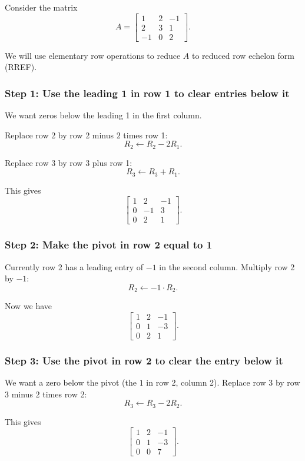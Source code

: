 \documentclass[12pt]{article}
\begin{document}
	Consider the matrix
	\[
	A =
	\begin{bmatrix}
		1 & 2 & -1 \\
		2 & 3 & 1 \\
		-1 & 0 & 2
	\end{bmatrix}.
	\]
	
	We will use elementary row operations to reduce $A$ to reduced row echelon form (RREF).
	
	\subsubsection*{Step 1: Use the leading 1 in row 1 to clear entries below it}
	
	We want zeros below the leading 1 in the first column.
	
	Replace row 2 by row 2 minus $2$ times row 1:
	\[
	R_2 \leftarrow R_2 - 2R_1.
	\]
	
	Replace row 3 by row 3 plus row 1:
	\[
	R_3 \leftarrow R_3 + R_1.
	\]
	
	This gives
	\[
	\begin{bmatrix}
		1 & 2 & -1 \\
		0 & -1 & 3 \\
		0 & 2 & 1
	\end{bmatrix}.
	\]
	
	\subsubsection*{Step 2: Make the pivot in row 2 equal to 1}
	
	Currently row 2 has a leading entry of $-1$ in the second column. Multiply row 2 by $-1$:
	\[
	R_2 \leftarrow -1 \cdot R_2.
	\]
	
	Now we have
	\[
	\begin{bmatrix}
		1 & 2 & -1 \\
		0 & 1 & -3 \\
		0 & 2 & 1
	\end{bmatrix}.
	\]
	
	\subsubsection*{Step 3: Use the pivot in row 2 to clear the entry below it}
	
	We want a zero below the pivot (the $1$ in row 2, column 2). Replace row 3 by row 3 minus $2$ times row 2:
	\[
	R_3 \leftarrow R_3 - 2R_2.
	\]
	
	This gives
	\[
	\begin{bmatrix}
		1 & 2 & -1 \\
		0 & 1 & -3 \\
		0 & 0 & 7
	\end{bmatrix}.
	\]
	
\end{document}
